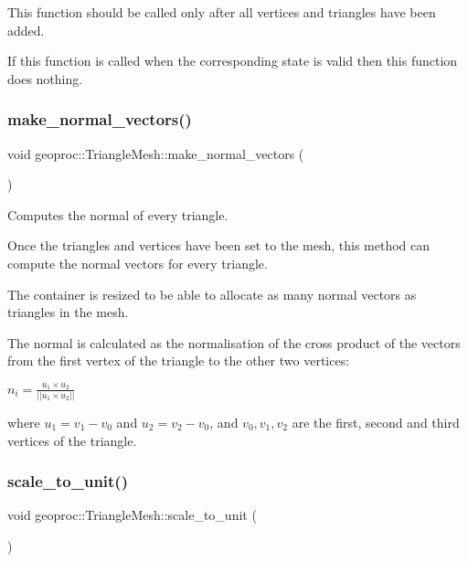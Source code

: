 This function should be called only after all vertices and triangles have been added.

If this function is called when the corresponding state is valid then this function does nothing. \mbox{\label{classgeoproc_1_1TriangleMesh_a638f0267d7d8e51498330e414fa25bfe}} 
\subsubsection{\texorpdfstring{make\+\_\+normal\+\_\+vectors()}{make\_normal\_vectors()}}
{\footnotesize\ttfamily void geoproc\+::\+Triangle\+Mesh\+::make\+\_\+normal\+\_\+vectors (\begin{DoxyParamCaption}{ }\end{DoxyParamCaption})}



Computes the normal of every triangle. 

Once the triangles and vertices have been set to the mesh, this method can compute the normal vectors for every triangle.

The container is resized to be able to allocate as many normal vectors as triangles in the mesh.

The normal is calculated as the normalisation of the cross product of the vectors from the first vertex of the triangle to the other two vertices\+:

$ n_i = \frac{ u_1 \times u_2 }{ || u_1 \times u_2 || } $

where $ u_1 = v_1 - v_0 $ and $ u_2 = v_2 - v_0 $, and $v_0,v_1,v_2$ are the first, second and third vertices of the triangle. \mbox{\label{classgeoproc_1_1TriangleMesh_a2b34ddfa21f906805451e6dbbb4ce064}} 
\subsubsection{\texorpdfstring{scale\+\_\+to\+\_\+unit()}{scale\_to\_unit()}}
{\footnotesize\ttfamily void geoproc\+::\+Triangle\+Mesh\+::scale\+\_\+to\+\_\+unit (\begin{DoxyParamCaption}{ }\end{DoxyParamCaption})}



